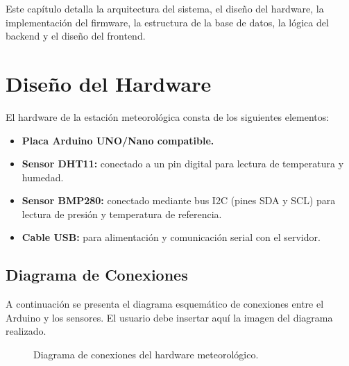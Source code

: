 \documentclass[12pt,a4paper]{report}
\begin{document}
Este capítulo detalla la arquitectura del sistema, el diseño del hardware, la implementación del firmware, la estructura de la base de datos, la lógica del backend y el diseño del frontend.

\section{Diseño del Hardware}
\label{sec:hardware}

El hardware de la estación meteorológica consta de los siguientes elementos:

\begin{itemize}[leftmargin=*]
    \item \textbf{Placa Arduino UNO/Nano compatible.}
    \item \textbf{Sensor DHT11:} conectado a un pin digital para lectura de temperatura y humedad.
    \item \textbf{Sensor BMP280:} conectado mediante bus I2C (pines SDA y SCL) para lectura de presión y temperatura de referencia.
    \item \textbf{Cable USB:} para alimentación y comunicación serial con el servidor.
\end{itemize}

\subsection{Diagrama de Conexiones}
\label{subsec:diagrama-conexiones}

A continuación se presenta el diagrama esquemático de conexiones entre el Arduino y los sensores. El usuario debe insertar aquí la imagen del diagrama realizado.

\begin{figure}[H]
    \centering
    \caption{Diagrama de conexiones del hardware meteorológico.}
    \label{fig:diagrama-conexiones}
\end{figure}
\end{document}
